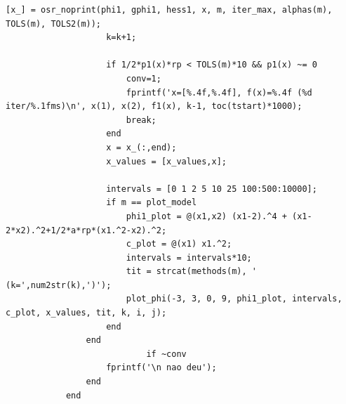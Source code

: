 \documentclass[10pt, a4paper]{article}
\begin{document}
\begin{minipage}{\linewidth}
\begin{lstlisting}[style=myStyle, caption= trecho de c\'odigo do problema 01 (penalidade), label=list_p01_pen]
                    [x_] = osr_noprint(phi1, gphi1, hess1, x, m, iter_max, alphas(m), TOLS(m), TOLS2(m));
                    k=k+1;

                    if 1/2*p1(x)*rp < TOLS(m)*10 && p1(x) ~= 0
                        conv=1;
                        fprintf('x=[%.4f,%.4f], f(x)=%.4f (%d iter/%.1fms)\n', x(1), x(2), f1(x), k-1, toc(tstart)*1000);
                        break;
                    end
                    x = x_(:,end);
                    x_values = [x_values,x];

                    intervals = [0 1 2 5 10 25 100:500:10000];
                    if m == plot_model
                        phi1_plot = @(x1,x2) (x1-2).^4 + (x1-2*x2).^2+1/2*a*rp*(x1.^2-x2).^2;
                        c_plot = @(x1) x1.^2;
                        intervals = intervals*10;
                        tit = strcat(methods(m), ' (k=',num2str(k),')');
                        plot_phi(-3, 3, 0, 9, phi1_plot, intervals, c_plot, x_values, tit, k, i, j);
                    end
                end
                            if ~conv
                    fprintf('\n nao deu');
                end
            end
      \end{lstlisting}
\end{minipage}
\end{document}
